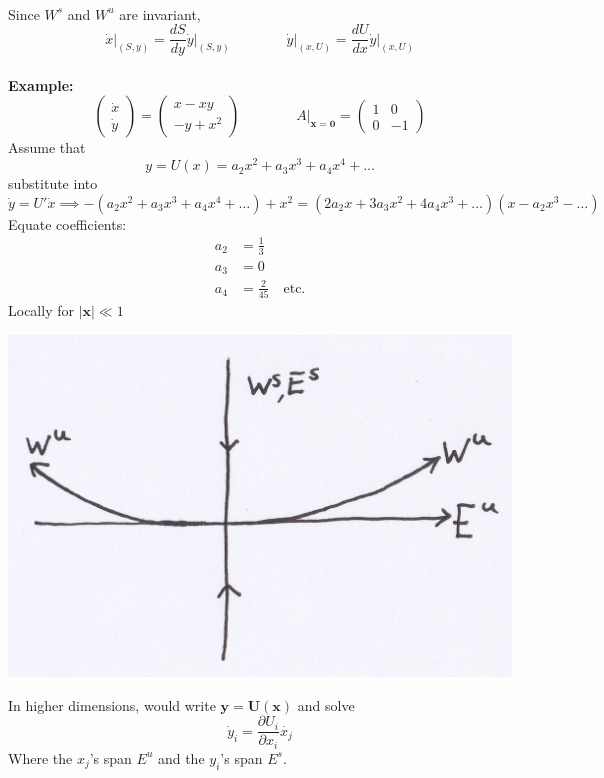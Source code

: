 \documentclass{article}
\begin{document}
\\
Since $W^s$ and $W^u$ are invariant,
\\
\[
 \left. \dot{x}\right|_{(S,y)} = \frac{dS}{dy} \left.\dot{y}\right|_{(S,y)} \qquad \qquad
 \left.\dot{y}\right|_{(x,U)} = \frac{dU}{dx} \left.\dot{y}\right|_{(x,U)}
\]
\\
\textbf{Example:} 
\[ \left( \begin{array}{c} \dot{x} \\ \dot{y} \end{array} \right) = 
\left( \begin{array}{c} x - xy \\ -y+x^2 \end{array} \right) \qquad \qquad
A|_{\bm{x} = \bm{0}} = \left( \begin{array}{cr} 1 & 0 \\ 0 & -1 \end{array} \right) \]
Assume that
\[ y = U(x) = a_2 x^2 + a_3 x^3 + a_4 x^4 + \dots \]
substitute into 
\[ \dot{y} = U'\dot{x}  \implies -(a_2x^2+a_3x^3 + a_4x^4 + \dots) + x^2 
= (2a_2x + 3a_3x^2 + 4a_4x^3 + \dots)(x - a_2x^3 - \dots ) \]
Equate coefficients:
\begin{align*}
a_2 &= \frac{1}{3} \\
a_3 &= 0 \\
a_4 &= \frac{2}{45} \quad \mbox{etc.}
\end{align*}
Locally for $|\bm{x}| \ll 1$ \\
\begin{center}
\includegraphics[scale = 0.15]{Diagram3.png}
\end{center}
In higher dimensions, would write $\bm{y} = \bm{U}(\bm{x})$ and solve
\[ \dot{y}_i = \frac{\partial U_i}{\partial x_i} \dot{x_j} \]
Where the $x_j$'s span $E^u$ and the $y_i$'s span $E^s$.
\end{document}
